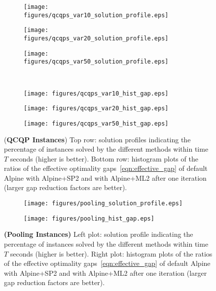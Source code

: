 \documentclass{article}
\begin{document}
\begin{figure}
\centering
\begin{subfigure}[b]{0.33\textwidth}
\texttt{[image: figures/qcqps\_var10\_solution\_profile.eps]}
\end{subfigure}%
\hfill
\begin{subfigure}[b]{0.33\textwidth}
\texttt{[image: figures/qcqps\_var20\_solution\_profile.eps]}
\end{subfigure}%
\hfill
\begin{subfigure}[b]{0.33\textwidth}
\texttt{[image: figures/qcqps\_var50\_solution\_profile.eps]}
\end{subfigure}\\[0.1in]
\begin{subfigure}[b]{0.33\textwidth}
\texttt{[image: figures/qcqps\_var10\_hist\_gap.eps]}
\end{subfigure}%
\hfill
\begin{subfigure}[b]{0.33\textwidth}
\texttt{[image: figures/qcqps\_var20\_hist\_gap.eps]}
\end{subfigure}%
\hfill
\begin{subfigure}[b]{0.33\textwidth}
\texttt{[image: figures/qcqps\_var50\_hist\_gap.eps]}
\end{subfigure}
\caption{
(\textbf{QCQP Instances}) Top row: solution profiles indicating the percentage of instances solved by the different methods within time $T$ seconds (higher is better). 
Bottom row: histogram plots of the ratios of the effective optimality gaps~\eqref{eqn:effective_gap} of default Alpine with Alpine+SP2 and with Alpine+ML2 after one iteration (larger gap reduction factors are better).}
\label{fig:plots_qcqp}
\end{figure}





\begin{figure}
\centering
\begin{subfigure}[b]{0.48\textwidth}
\centering
\texttt{[image: figures/pooling\_solution\_profile.eps]}
\end{subfigure}%
\hfill
\begin{subfigure}[b]{0.48\textwidth}
\centering
\texttt{[image: figures/pooling\_hist\_gap.eps]}
\end{subfigure}
\caption{\textbf{(Pooling Instances)} Left plot: solution profile indicating the percentage of instances solved by the different methods within time $T$ seconds (higher is better). Right plot: histogram plots of the ratios of the effective optimality gaps~\eqref{eqn:effective_gap} of default Alpine with Alpine+SP2 and with Alpine+ML2 after one iteration (larger gap reduction factors are better).}
\label{fig:plots_pooling}
\end{figure}
\end{document}
